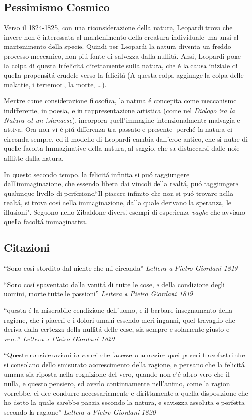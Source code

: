 \documentclass{report}
\begin{document}
\subsection*{Pessimismo Cosmico}
Verso il 1824-1825, con una riconsiderazione della natura, Leopardi trova che invece non é interessata al mantenimento della creatura individuale, ma ansi al mantenimento della specie. Quindi per Leopardi la natura diventa un freddo processo meccanico, non piú fonte di salvezza dalla nullitá. Ansi, Leopardi pone la colpa di questa infelicitá direttamente sulla natura, che é la causa iniziale di quella propensitá crudele verso la felicitá (A questa colpa aggiunge la colpa delle malattie, i terremoti, la morte, \dots).

Mentre come considerazione filosofica, la natura é concepita come meccanismo indifferente, in poesia, e in rappresentazione artistica (come nel \emph{Dialogo tra la Natura ed un Islandese}), incorpora quell'immagine intenzionalmente malvagia e attiva. Ora non vi é piú differenza tra passato e presente, perché la natura ci circonda sempre, ed il modello di Leopardi cambia dall'eroe antico, che si nutre di quelle facolta Immaginative della natura, al saggio, che sa distaccarsi dalle noie afflitte dalla natura.

In questo secondo tempo, la felicitá infinita si puó raggiungere dall'immaginazione, che essendo libera dai vincoli della realtá, puó raggiungere qualunque livello di perfezione.``Il piacere infinito che non si puó trovare nella realtá, si trova cosí nella immaginazione, dalla quale derivano la speranza, le illusioni". Seguono nello Zibaldone diversi esempi di esperienze \emph{vaghe} che avviano quella facoltá immaginativa.
\subsection*{Citazioni}
``Sono cosí stordito dal niente che mi circonda'' \emph{Lettera a Pietro Giordani 1819}

``Sono cosí spaventato dalla vanitá di tutte le cose, e della condizione degli uomini, morte tutte le passioni'' \emph{Lettera a Pietro Giordani 1819}

``questa é la miserabile condizione dell'uomo, e il barbaro insegnamento della ragione, che i piaceri e i dolori umani essendo meri inganni, quel travaglio che deriva dalla certezza della nullitá delle cose, sia sempre e solamente giusto e vero.'' \emph{Lettera a Pietro Giordani 1820}

``Queste considerazioni io vorrei che facessero arrossire quei poveri filosofastri che si consolano dello smisurato accrescimento della ragione, e pensano che la felicitá umana sia riposta nella cognizione del vero, quando non c'é altro vero che il nulla, e questo pensiero, ed averlo continuamente nell'animo, come la ragion vorrebbe, ci dee condurre necessariamente e dirittamente a quella disposizione che ho detto la quale sarebbe pazzia secondo la natura, e saviezza assoluta e perfetta secondo la ragione'' \emph{Lettera a Pietro Giordani 1820}
\end{document}
